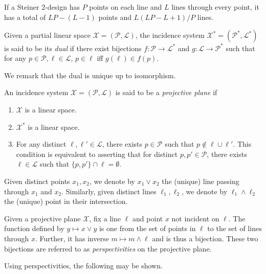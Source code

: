 	If a Steiner 2-design has $P$ points on each line and $L$ lines through every point, it has a total of $LP - (L - 1)$ points and $L (LP-L+1) / P$ lines.

	\begin{fdef}[Dual]
		Given a partial linear space $\mathcal{X}=(\mathcal{P},\mathcal{L})$, the incidence system $\mathcal{X}^* = (\mathcal{P}^*,\mathcal{L}^*)$ is said to be its \emph{dual} if there exist bijections $f : \mathcal{P} \to \mathcal{L}^*$ and $g : \mathcal{L} \to \mathcal{P}^*$ such that for any $p \in \mathcal{P}, \ell \in \mathcal{L}$, $p \in \ell$ iff $g(\ell)\in f(p)$.	
	\end{fdef}
	We remark that the dual is unique up to isomorphism.

	\begin{fdef}
		An incidence system $\mathcal{X} = (\mathcal{P},\mathcal{L})$ is said to be a \emph{projective plane} if
		\begin{enumerate}
			\item $\mathcal{X}$ is a linear space.
			\item $\mathcal{X}^*$ is a linear space.
			\item For any distinct $\ell,\ell' \in \mathcal{L}$, there exists $p \in \mathcal{P}$ such that $p \not\in \ell \cup \ell'$. This condition is equivalent to asserting that for distinct $p,p' \in \mathcal{P}$, there exists $\ell \in \mathcal{L}$ such that $\{p,p'\} \cap \ell = \emptyset$.
		\end{enumerate}
	\end{fdef}

	Given distinct points $x_1,x_2$, we denote by $x_1 \lor x_2$ the (unique) line passing through $x_1$ and $x_2$. Similarly, given distinct lines $\ell_1,\ell_2$, we denote by $\ell_1 \land \ell_2$ the (unique) point in their intersection.

	\begin{fdef}
		Given a projective plane $\mathcal{X}$, fix a line $\ell$ and point $x$ not incident on $\ell$. The function defined by $y \mapsto x \lor y$ is one from the set of points in $\ell$ to the set of lines through $x$. Further, it has inverse $m \mapsto m \land \ell$ and is thus a bijection. These two bijections are referred to as \emph{perspectivities} on the projective plane.
	\end{fdef}

	Using perspectivities, the following may be shown.

